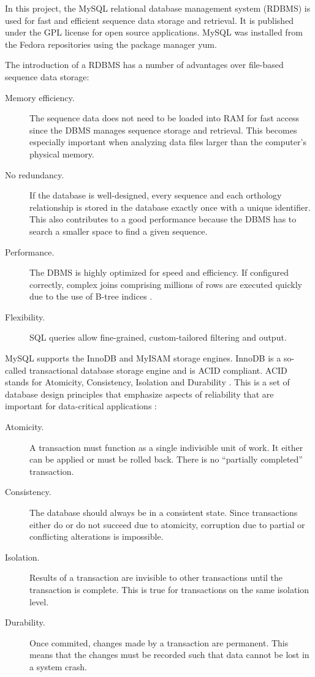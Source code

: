 In this project, the MySQL relational database management system (RDBMS) is used
for fast and efficient sequence data storage and retrieval. It is published
under the GPL license for open source applications. MySQL was installed from the
Fedora repositories using the package manager yum.

The introduction of a RDBMS has a number of advantages over file-based sequence
data storage:

\begin{description}
	\item[Memory efficiency.] The sequence data does not need to be loaded into
		RAM for fast access since the DBMS manages sequence storage and retrieval.
		This becomes especially important when analyzing data files larger than the
		computer's physical memory.
	\item[No redundancy.] If the database is well-designed, every sequence and
		each orthology relationship is stored in the database exactly once with a
		unique identifier. This also contributes to a good performance because the
		DBMS has to search a smaller space to find a given sequence.
	\item[Performance.] The DBMS is highly optimized for speed and efficiency. If
		configured correctly, complex joins comprising millions of rows are executed
		quickly due to the use of B-tree indices \citep{comer1979}.
	\item[Flexibility.] SQL queries allow fine-grained, custom-tailored filtering
		and output.
\end{description}

MySQL supports the InnoDB and MyISAM storage engines. InnoDB is a so-called
transactional database storage engine and is ACID compliant. ACID stands for
Atomicity, Consistency, Isolation and Durability \citep{haerder1983}.  This is a
set of database design principles that emphasize aspects of reliability that are
important for data-critical applications \citep{schwartz2012}:

\begin{description}
	\item[Atomicity.] A transaction must function as a single indivisible unit of
		work. It either can be applied or must be rolled back. There is no
		``partially completed'' transaction.
	\item[Consistency.] The database should always be in a consistent state. Since
		transactions either do or do not succeed due to atomicity, corruption due to
		partial or conflicting alterations is impossible.
	\item[Isolation.] Results of a transaction are invisible to other
		transactions until the transaction is complete. This is true for
		transactions on the same isolation level.
	\item[Durability.] Once commited, changes made by a transaction are permanent.
		This means that the changes must be recorded such that data cannot be lost
		in a system crash. 
\end{description}

